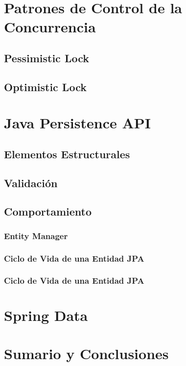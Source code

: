 \documentclass[a4paper,slidestop,xcolor=pst,blue]{beamer}
\begin{document}
\section{Patrones de Control de la Concurrencia}

\subsection{Pessimistic Lock}

\subsection{Optimistic Lock}

\section{Java Persistence API}

\subsection{Elementos Estructurales}

\subsection{Validación}

\subsection{Comportamiento}

\begin{frame}[c]
    \frametitle{Entity Manager}
\end{frame}

\begin{frame}[c]
    \frametitle{Ciclo de Vida de una Entidad JPA}
\end{frame}

\begin{frame}[c]
    \frametitle{Ciclo de Vida de una Entidad JPA}
\end{frame}

\section{Spring Data}

\section{Sumario y Conclusiones}
\end{document}
